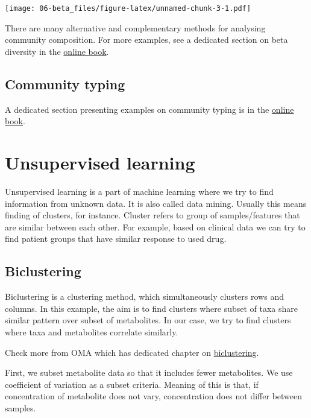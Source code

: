 \documentclass[
  oneside]{book}
\begin{document}
\texttt{[image: 06-beta\_files/figure-latex/unnamed-chunk-3-1.pdf]}

There are many alternative and complementary methods for analysing
community composition. For more examples, see a dedicated section on
beta diversity in the \href{https://microbiome.github.io/OMA/microbiome-diversity.html\#beta-diversity}{online
book}.

\hypertarget{community-typing}{%
\section{Community typing}\label{community-typing}}

A dedicated section presenting examples on community typing is in the
\href{https://microbiome.github.io/OMA/microbiome-community.html\#community-typing}{online book}.

\hypertarget{unsupervised-learning}{%
\chapter{Unsupervised learning}\label{unsupervised-learning}}

Unsupervised learning is a part of machine learning where we try to find information
from unknown data. It is also called data mining. Usually this means finding of
clusters, for instance. Cluster refers to group of samples/features that are similar
between each other. For example, based on clinical data we can try to find patient
groups that have similar response to used drug.

\hypertarget{biclustering}{%
\section{Biclustering}\label{biclustering}}

Biclustering is a clustering method, which simultaneously clusters rows and columns.
In this example, the aim is to find clusters where subset of taxa share similar
pattern over subset of metabolites. In our case, we try to find clusters where
taxa and metabolites correlate similarly.

Check more from OMA which has dedicated chapter on
\href{https://microbiome.github.io/OMA/biclustering.html}{biclustering}.

First, we subset metabolite data so that it includes fewer metabolites. We use
coefficient of variation as a subset criteria. Meaning of this is that, if concentration
of metabolite does not vary, concentration does not differ between samples.
\end{document}
